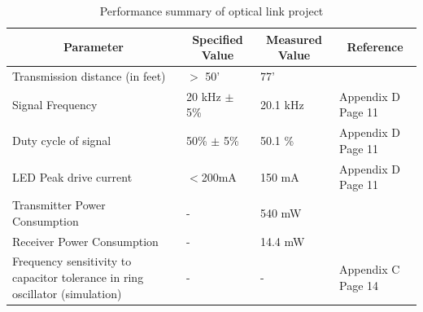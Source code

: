 \documentclass{article}
\begin{document}
\begin{table}[H]
	\centering
	\caption{Performance summary of optical link project}
	\label{tab:opticallink}
	\begin{tabular}{|l|l|l|l|}
		\hline
		\multicolumn{1}{|c|}{\textbf{Parameter}}                                     & \multicolumn{1}{c|}{\textbf{Specified Value}} & \multicolumn{1}{c|}{\textbf{Measured Value}} & \multicolumn{1}{c|}{\textbf{Reference}} \\ \hline
		Transmission distance (in feet)                                              & $>$ 50'                                       & 77'                                          &                                       \\ \hline
		Signal Frequency                                                             & 20 kHz $\pm$ 5\%                              & 20.1 kHz                                     &    Appendix D Page 11                                     \\ \hline
		Duty cycle of signal                                                         & 50\% $\pm$ 5\%                                & 50.1 \%                                      &     Appendix D Page 11                                    \\ \hline
		LED Peak drive current                                                       & $<$200mA                                      & 150 mA                                       &   Appendix D Page 11                                      \\ \hline
		Transmitter Power Consumption                                                & -                                             &  540 mW                                            &                                         \\ \hline
		Receiver Power Consumption                                                   & -                                             &    14.4 mW                                          &                                         \\ \hline
		Frequency sensitivity to capacitor tolerance in ring oscillator (simulation) & -                                             &              -                                &   Appendix C Page 14                                      \\ \hline
	\end{tabular}
\end{table}
\end{document}
